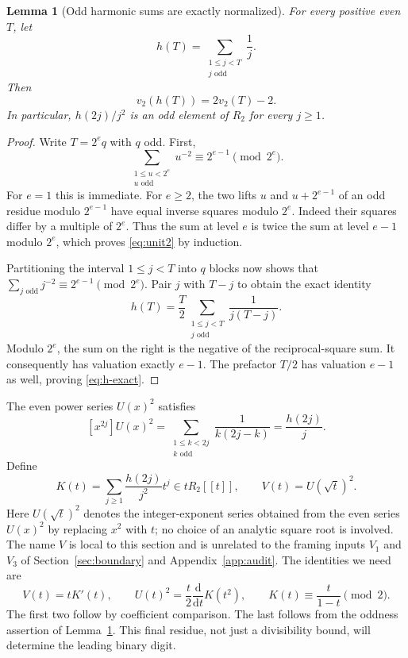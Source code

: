 \documentclass[11pt,a4paper]{article}
\numberwithin{equation}{section}
\newtheorem{lemma}[theorem]{Lemma}
\theoremstyle{definition}
\theoremstyle{remark}
\begin{document}
\begin{lemma}[Odd harmonic sums are exactly normalized]\label{lem:binary-H}
For every positive even $T$, let
\[
 h(T)=\sum_{\substack{1\le j<T\\j\text{ odd}}}\frac1j.
\]
Then
\begin{equation}\label{eq:h-exact}
 v_2(h(T))=2v_2(T)-2.
\end{equation}
In particular, $h(2j)/j^2$ is an odd element of $R_2$ for every $j\ge1$.
\end{lemma}
\begin{proof}
Write $T=2^e q$ with $q$ odd. First,
\begin{equation}\label{eq:unit2}
 \sum_{\substack{1\le u<2^e\\u\text{ odd}}}u^{-2}
 \equiv2^{e-1}\pmod{2^e}.
\end{equation}
For $e=1$ this is immediate. For $e\ge2$, the two lifts $u$ and
$u+2^{e-1}$ of an odd residue modulo $2^{e-1}$ have equal inverse squares
modulo $2^e$. Indeed their squares differ by a multiple of $2^e$.
Thus the sum at level $e$ is twice the sum at level $e-1$ modulo $2^e$,
which proves \eqref{eq:unit2} by induction.

Partitioning the interval $1\le j<T$ into $q$ blocks now shows that
$\sum_{j\text{ odd}}j^{-2}\equiv2^{e-1}\pmod{2^e}$. Pair $j$ with
$T-j$ to obtain the exact identity
\[
 h(T)=\frac T2
 \sum_{\substack{1\le j<T\\j\text{ odd}}}\frac1{j(T-j)}.
\]
Modulo $2^e$, the sum on the right is the negative of the reciprocal-square
sum. It consequently has valuation exactly $e-1$. The prefactor $T/2$
has valuation $e-1$ as well, proving \eqref{eq:h-exact}.
\end{proof}

The even power series $U(x)^2$ satisfies
\[
 [x^{2j}]U(x)^2
 =\sum_{\substack{1\le k<2j\\k\text{ odd}}}\frac1{k(2j-k)}
 =\frac{h(2j)}j.
\]
Define
\begin{equation}\label{eq:K}
 K(t)=\sum_{j\ge1}\frac{h(2j)}{j^2}t^j\in tR_2[[t]],
 \qquad V(t)=U(\sqrt t)^2.
\end{equation}
Here $U(\sqrt t)^2$ denotes the integer-exponent series obtained from the
even series $U(x)^2$ by replacing $x^2$ with $t$; no choice of an analytic
square root is involved. The name $V$ is local to this section and is
unrelated to the framing inputs $V_1$ and $V_3$ of
Section~\ref{sec:boundary} and Appendix~\ref{app:audit}. The identities we need are
\begin{equation}\label{eq:K-identities}
 V(t)=tK'(t),\qquad
 U(t)^2=\frac t2\frac{\mathrm d}{\mathrm dt}K(t^2),\qquad
 K(t)\equiv\frac{t}{1-t}\pmod2.
\end{equation}
The first two follow by coefficient comparison. The last follows from the
oddness assertion of Lemma~\ref{lem:binary-H}. This final residue, not just
a divisibility bound, will determine the leading binary digit.
\end{document}
